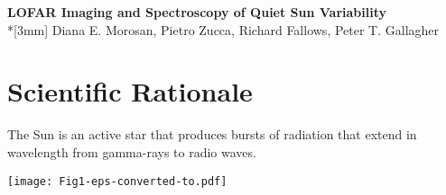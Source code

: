 \documentclass[a4paper,11pt]{article}
\begin{document}
\begin{center}
{\bf \Large LOFAR Imaging and Spectroscopy of Quiet Sun Variability} \\*[3mm]
{Diana E. Morosan, Pietro Zucca, Richard Fallows, Peter T. Gallagher}
\end{center}
\section{Scientific Rationale}
{The Sun is an active star that produces bursts of radiation that extend in wavelength from gamma-rays to radio waves. }

\begin{figure*}[ht]
\centering
\texttt{[image: Fig1-eps-converted-to.pdf]}
\caption{ Map of a 126-beam tied-array pointing at the Sun.}
\label{fig:fig1}
\end{figure*}
\end{document}
